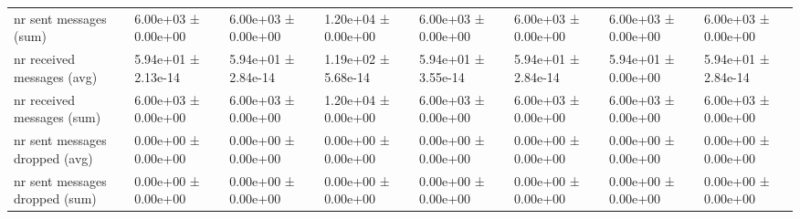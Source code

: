 \begin{tabular}{llllllll}
 nr sent messages (sum)             & 6.00e+03 ± 0.00e+00 & 6.00e+03 ± 0.00e+00 & 1.20e+04 ± 0.00e+00 & 6.00e+03 ± 0.00e+00 & 6.00e+03 ± 0.00e+00 & 6.00e+03 ± 0.00e+00 & 6.00e+03 ± 0.00e+00 \\
 nr received messages (avg)         & 5.94e+01 ± 2.13e-14 & 5.94e+01 ± 2.84e-14 & 1.19e+02 ± 5.68e-14 & 5.94e+01 ± 3.55e-14 & 5.94e+01 ± 2.84e-14 & 5.94e+01 ± 0.00e+00 & 5.94e+01 ± 2.84e-14 \\
 nr received messages (sum)         & 6.00e+03 ± 0.00e+00 & 6.00e+03 ± 0.00e+00 & 1.20e+04 ± 0.00e+00 & 6.00e+03 ± 0.00e+00 & 6.00e+03 ± 0.00e+00 & 6.00e+03 ± 0.00e+00 & 6.00e+03 ± 0.00e+00 \\
 nr sent messages dropped (avg)     & 0.00e+00 ± 0.00e+00 & 0.00e+00 ± 0.00e+00 & 0.00e+00 ± 0.00e+00 & 0.00e+00 ± 0.00e+00 & 0.00e+00 ± 0.00e+00 & 0.00e+00 ± 0.00e+00 & 0.00e+00 ± 0.00e+00 \\
 nr sent messages dropped (sum)     & 0.00e+00 ± 0.00e+00 & 0.00e+00 ± 0.00e+00 & 0.00e+00 ± 0.00e+00 & 0.00e+00 ± 0.00e+00 & 0.00e+00 ± 0.00e+00 & 0.00e+00 ± 0.00e+00 & 0.00e+00 ± 0.00e+00 \\
\hline
\end{tabular}